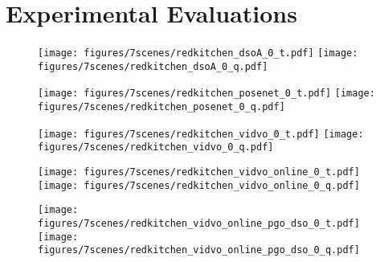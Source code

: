\section{Experimental Evaluations}
\label{sec:results}

\begin{figure*}
    \captionsetup[subfigure]{labelformat=empty}
    \centering


    \begin{subfigure}{0.19\linewidth}
        \centering
        \texttt{[image: figures/7scenes/redkitchen\_dsoA\_0\_t.pdf]}
        \texttt{[image: figures/7scenes/redkitchen\_dsoA\_0\_q.pdf]}
    \end{subfigure}
    \hfill
    \begin{subfigure}{0.19\linewidth}
        \centering
        \texttt{[image: figures/7scenes/redkitchen\_posenet\_0\_t.pdf]}
        \texttt{[image: figures/7scenes/redkitchen\_posenet\_0\_q.pdf]}
    \end{subfigure}
    \hfill
    \begin{subfigure}{0.19\linewidth}
        \centering
        \texttt{[image: figures/7scenes/redkitchen\_vidvo\_0\_t.pdf]}
        \texttt{[image: figures/7scenes/redkitchen\_vidvo\_0\_q.pdf]}
    \end{subfigure}
    \hfill
    \begin{subfigure}{0.19\linewidth}
        \centering
        \texttt{[image: figures/7scenes/redkitchen\_vidvo\_online\_0\_t.pdf]}
        \texttt{[image: figures/7scenes/redkitchen\_vidvo\_online\_0\_q.pdf]}
    \end{subfigure}
    \hfill
    \begin{subfigure}{0.19\linewidth}
        \centering
        \texttt{[image: figures/7scenes/redkitchen\_vidvo\_online\_pgo\_dso\_0\_t.pdf]}
        \texttt{[image: figures/7scenes/redkitchen\_vidvo\_online\_pgo\_dso\_0\_q.pdf]}
    \end{subfigure}


\end{figure*}
